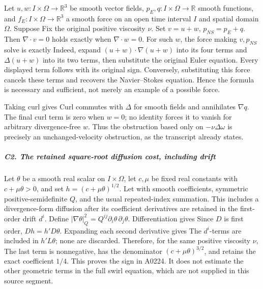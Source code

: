 Let \(u,w:I\times\Omega\to\mathbb R^3\) be smooth vector fields,
\(p_E,q:I\times\Omega\to\mathbb R\) smooth functions, and
\(f_E:I\times\Omega\to\mathbb R^3\) a smooth force on an open time
interval \(I\) and spatial domain \(\Omega\). Suppose  Fix the original positive viscosity \(\nu\). Set \(v=u+w\),
\(p_{NS}=p_E+q\). Then \(\nabla\cdot v=0\) holds exactly when
\(\nabla\cdot w=0\). For such \(w\), the force making \(v,p_{NS}\) solve
 is exactly  Indeed, expand \((u+w)\cdot\nabla(u+w)\) into its four terms and
\(\Delta(u+w)\) into its two terms, then substitute the original Euler
equation. Every displayed term follows with its original sign.
Conversely, substituting this force cancels these terms and recovers the
Navier--Stokes equation. Hence the formula is necessary and sufficient,
not merely an example of a possible force.

Taking curl gives  Curl commutes with \(\Delta\) for smooth fields and annihilates
\(\nabla q\). The final curl term is zero when \(w=0\); no identity
forces it to vanish for arbitrary divergence-free \(w\). Thus the
obstruction based only on \(-\nu\Delta\omega\) is precisely an
unchanged-velocity obstruction, as the transcript already states.

\subparagraph{C2. The retained square-root diffusion cost, including
drift}\label{c2.-the-retained-square-root-diffusion-cost-including-drift}

Let \(\theta\) be a smooth real scalar on \(I\times\Omega\), let
\(c,\mu\) be fixed real constants with \(c+\mu\theta>0\), and set
\(h=(c+\mu\theta)^{1/2}\). Let  with smooth coefficients, symmetric positive-semidefinite \(Q\), and
the usual repeated-index summation. This includes a divergence-form
diffusion after its coefficient derivatives are retained in the
first-order drift \(d^i\). Define
\(|\nabla\theta|_Q^2=Q^{ij}\partial_i\theta\,\partial_j\theta\).
Differentiation gives  Since \(D\) is first order, \(Dh=h'D\theta\). Expanding each second
derivative gives  The \(d^i\)-terms are included in \(h'L\theta\); none are discarded.
Therefore, for the same positive viscosity \(\nu\),  The last term is nonnegative, has the denominator
\((c+\mu\theta)^{3/2}\), and retains the exact coefficient \(1/4\). This
proves the sign in A0224. It does not estimate the other geometric terms
in the full swirl equation, which are not supplied in this source
segment.

